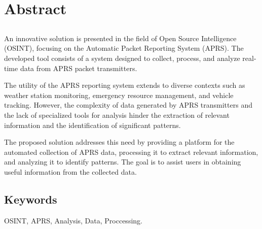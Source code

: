\chapter*{Abstract}

\section*{\tituloPortadaEngVal}

An innovative solution is presented in the field of Open Source Intelligence (OSINT), focusing on the Automatic Packet Reporting System (APRS). The developed tool consists of a system designed to collect, process, and analyze real-time data from APRS packet transmitters.

The utility of the APRS reporting system extends to diverse contexts such as weather station monitoring, emergency resource management, and vehicle tracking. However, the complexity of data generated by APRS transmitters and the lack of specialized tools for analysis hinder the extraction of relevant information and the identification of significant patterns.

The proposed solution addresses this need by providing a platform for the automated collection of APRS data, processing it to extract relevant information, and analyzing it to identify patterns. The goal is to assist users in obtaining useful information from the collected data.


\section*{Keywords}

\noindent OSINT, APRS, Analysis, Data, Proccessing.



